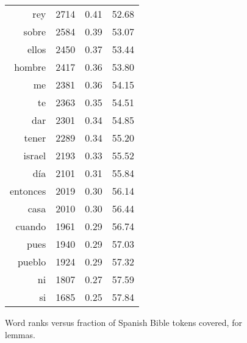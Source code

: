 \begin{figure*}
\begin{tiny}
\begin{centering}
\begin{tabular}{|r|c|c|c|}
rey & 2714 & 0.41 & 52.68 \\
sobre & 2584 & 0.39 & 53.07 \\
ellos & 2450 & 0.37 & 53.44 \\
hombre & 2417 & 0.36 & 53.80 \\
me & 2381 & 0.36 & 54.15 \\
te & 2363 & 0.35 & 54.51 \\
dar & 2301 & 0.34 & 54.85 \\
tener & 2289 & 0.34 & 55.20 \\
israel & 2193 & 0.33 & 55.52 \\
día & 2101 & 0.31 & 55.84 \\
entonces & 2019 & 0.30 & 56.14 \\
casa & 2010 & 0.30 & 56.44 \\
cuando & 1961 & 0.29 & 56.74 \\
pues & 1940 & 0.29 & 57.03 \\
pueblo & 1924 & 0.29 & 57.32 \\
ni & 1807 & 0.27 & 57.59 \\
si & 1685 & 0.25 & 57.84 \\
\hline
\end{tabular}
\end{centering}
\end{tiny}
  \caption{Word ranks versus fraction of Spanish Bible tokens covered, for
  lemmas.}
  \label{fig:mostcommon-lemmas}
\end{figure*}

